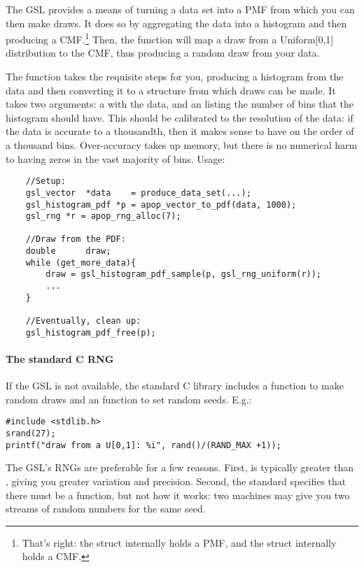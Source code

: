 The GSL provides a means of turning a data set into a PMF from which you
can then make draws.  It does so by aggregating the data into a histogram
and then producing a CMF.\footnote{That's right: the 
struct internally holds a PMF, and the  struct
internally holds a CMF.} Then, the 
function will map a draw from a Uniform[0,1] distribution to the CMF,
thus producing a random draw from your data.

The  function takes the requisite steps
for you, producing a histogram from the data and then converting it to
a  structure from which draws can be
made. It takes two arguments: a  with the data, and
an  listing the number of bins that the histogram should
have. This should be calibrated to the resolution of the data: if the
data is accurate to a thousandth, then it makes sense to have on the
order  of a thousand
bins. Over-accuracy takes up memory, but there is no numerical harm to having
zeros in the vast majority of bins. Usage:
\begin{lstlisting}
    //Setup:
    gsl_vector  *data    = produce_data_set(...);
    gsl_histogram_pdf *p = apop_vector_to_pdf(data, 1000);
    gsl_rng *r = apop_rng_alloc(7);

    //Draw from the PDF:
    double      draw;
    while (get_more_data){
        draw = gsl_histogram_pdf_sample(p, gsl_rng_uniform(r));
        ...
    }

    //Eventually, clean up:
    gsl_histogram_pdf_free(p);
\end{lstlisting}

\paragraph{\treesymbol The standard C RNG}
If the GSL is not available, the standard C library includes a 
function to make random draws and an  function to set random
seeds. E.g.:
\begin{lstlisting}
#include <stdlib.h>
srand(27);
printf("draw from a U[0,1]: %i", rand()/(RAND_MAX +1));
\end{lstlisting}

The GSL's RNGs are preferable for a few reasons. First,
 is typically greater than ,
giving you greater variation and precision. 
Second, the standard specifies that there must be a  function,
but not how it works: two machines may give you two streams of random
numbers for the same seed.

